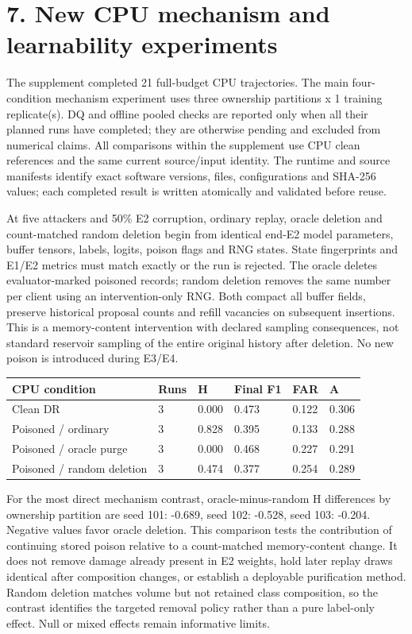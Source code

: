 \documentclass[
  10pt,
  a4paper,
]{article}
\begin{document}
\hypertarget{new-cpu-mechanism-and-learnability-experiments}{%
\section{7. New CPU mechanism and learnability
experiments}\label{new-cpu-mechanism-and-learnability-experiments}}

The supplement completed 21 full-budget CPU trajectories. The main
four-condition mechanism experiment uses three ownership partitions x 1
training replicate(s). DQ and offline pooled checks are reported only
when all their planned runs have completed; they are otherwise pending
and excluded from numerical claims. All comparisons within the
supplement use CPU clean references and the same current source/input
identity. The runtime and source manifests identify exact software
versions, files, configurations and SHA-256 values; each completed
result is written atomically and validated before reuse.

At five attackers and 50\% E2 corruption, ordinary replay, oracle
deletion and count-matched random deletion begin from identical end-E2
model parameters, buffer tensors, labels, logits, poison flags and RNG
states. State fingerprints and E1/E2 metrics must match exactly or the
run is rejected. The oracle deletes evaluator-marked poisoned records;
random deletion removes the same number per client using an
intervention-only RNG. Both compact all buffer fields, preserve
historical proposal counts and refill vacancies on subsequent
insertions. This is a memory-content intervention with declared sampling
consequences, not standard reservoir sampling of the entire original
history after deletion. No new poison is introduced during E3/E4.

\begin{longtable}[]{@{}llllll@{}}
\toprule
CPU condition & Runs & H & Final F1 & FAR & A \\
\midrule
\endhead
Clean DR & 3 & 0.000 & 0.473 & 0.122 & 0.306 \\
Poisoned / ordinary & 3 & 0.828 & 0.395 & 0.133 & 0.288 \\
Poisoned / oracle purge & 3 & 0.000 & 0.468 & 0.227 & 0.291 \\
Poisoned / random deletion & 3 & 0.474 & 0.377 & 0.254 & 0.289 \\
\bottomrule
\end{longtable}

For the most direct mechanism contrast, oracle-minus-random H
differences by ownership partition are seed 101: -0.689, seed 102:
-0.528, seed 103: -0.204. Negative values favor oracle deletion. This
comparison tests the contribution of continuing stored poison relative
to a count-matched memory-content change. It does not remove damage
already present in E2 weights, hold later replay draws identical after
composition changes, or establish a deployable purification method.
Random deletion matches volume but not retained class composition, so
the contrast identifies the targeted removal policy rather than a pure
label-only effect. Null or mixed effects remain informative limits.
\end{document}
